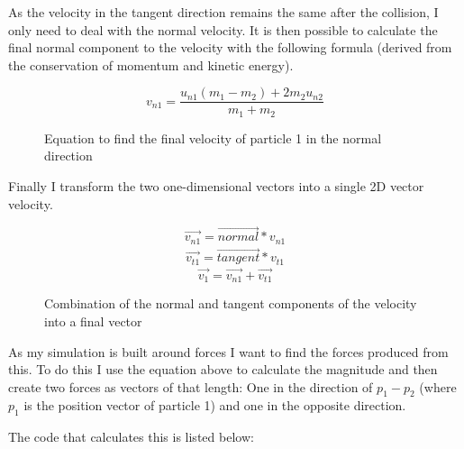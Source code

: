 	As the velocity in the tangent direction remains the same after the collision, I only need to deal with the normal velocity. It is then possible to calculate the final normal component to the velocity with the following formula (derived from the conservation of momentum and kinetic energy).
	\begin{figure}[h!]
		\begin{equation}
			v_{n1} = \frac{u_{n1}(m_1 - m_2) + 2 m_2 u_{n2}}{m_1+m_2}
		\end{equation}
		\caption{Equation to find the final velocity of particle 1 in the normal direction}
		\label{fig:colEqn}
	\end{figure}

	\newpage
	
	Finally I transform the two one-dimensional vectors into a single 2D vector velocity.
	
	\begin{figure}[h]
		\begin{equation}
			\vec{v_{n1}} = \vec{normal} * v_{n1}
		\end{equation}
		\begin{eqnarray}
			\vec{v_{t1}} = \vec{tangent} * v_{t1}
		\end{eqnarray}
		\begin{equation}
			\vec{v_1} = \vec{v_{n1}} + \vec{v_{t1}}
		\end{equation}
		\caption{Combination of the normal and tangent components of the velocity into a final vector}
		\label{fig:movEqn}
	\end{figure}

	As my simulation is built around forces I want to find the forces produced from this. To do this I use the equation above to calculate the magnitude and then create two forces as vectors of that length: One in the direction of $p_1-p_2$ (where $p_1$ is the position vector of particle 1) and one in the opposite direction.

	The code that calculates this is listed below:
	

